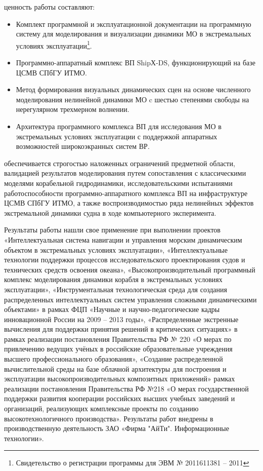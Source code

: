  ценность работы составляют:
\begin{itemize}
\item	Комплект программной и эксплуатационной документации на программную систему для моделирования и визуализации динамики МО в экстремальных условиях эксплуатации\footnote{Свидетельство о регистрации программы для ЭВМ № 2011611381 – 2011}.
\item	Программно-аппаратный комплекс ВП ShipХ-DS, функционирующий на базе ЦСМВ СПбГУ ИТМО.
\end{itemize}



\begin{itemize}
\item	Метод формирования визуальных динамических сцен на основе численного моделирования нелинейной динамики МО c шестью степенями свободы на нерегулярном трехмерном волнении.
\item	Архитектура программного комплекса ВП для исследования МО в экстремальных условиях эксплуатации с поддержкой аппаратных возможностей широкоэкранных систем ВР.
\end{itemize}


 обеспечивается строгостью наложенных ограничений предметной области, валидацией результатов моделирования путем сопоставления с классическими моделями корабельной гидродинамики, исследовательскими испытаниями работоспособности программно-аппаратного комплекса ВП на инфраструктуре ЦСМВ СПбГУ ИТМО, а также воспроизводимостью ряда нелинейных эффектов экстремальной динамики судна в ходе компьютерного эксперимента.

 Результаты работы нашли свое применение при выполнении проектов «Интеллектуальная система навигации и управления морским динамическим объектом в экстремальных условиях эксплуатации», «Интеллектуальные технологии поддержки процессов исследовательского проектирования судов и технических средств освоения океана», «Высокопроизводительный программный комплекс моделирования динамики корабля в экстремальных условиях эксплуатации», «Инструментальная технологическая среда для создания распределенных интеллектуальных систем управления сложными динамическими объектами» в рамках ФЦП «Научные и научно-педагогические кадры инновационной России на 2009 – 2013 годы», «Распределенные экстренные вычисления для поддержки принятия решений в критических ситуациях» в рамках реализации постановления Правительства РФ № 220 «О мерах по привлечению ведущих учёных в российские образовательные учреждения высшего профессионального образования», «Создание распределенной вычислительной среды на базе облачной архитектуры для построения и эксплуатации высокопроизводительных композитных приложений» рамках реализации постановления Правительства РФ №218 «О мерах государственной поддержки развития кооперации российских высших учебных заведений и организаций, реализующих комплексные проекты по созданию высокотехнологичного производства».  Результаты работ внедрены в производственную деятельность ЗАО «Фирма "АйТи". Информационные технологии».

